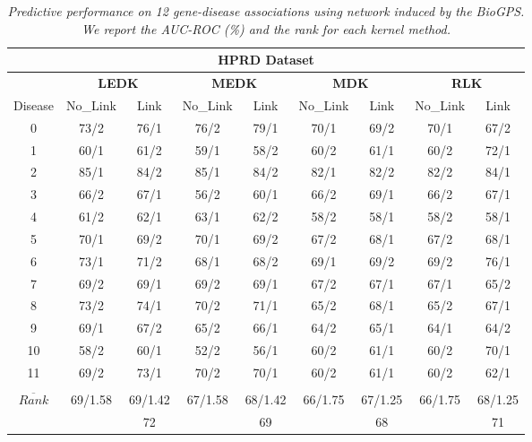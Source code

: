 \documentclass[runningheads,a4paper]{llncs}
\begin{document}
\begin{table*}[!htb]
\centering
\begin{tabular}{|c|c|c|c|c|c|c|c|c|}
\hline
         \multicolumn{9}{|c|}{\textbf{HPRD Dataset}}\\
 \hline
 & \multicolumn{2}{c|}{\textbf{LEDK}} & \multicolumn{2}{c|}{\textbf{MEDK}} & \multicolumn{2}{c|}{\textbf{MDK}} & \multicolumn{2}{c|}{\textbf{RLK}} \\
 \hline
  Disease & No\_Link & Link & No\_Link & Link & No\_Link & Link & No\_Link & Link \\
 \hline
	0 & 73/2 & 76/1 & 76/2 & 79/1 & 70/1 & 69/2 & 70/1 & 67/2 \\

	1 & 60/1 & 61/2 & 59/1 & 58/2 & 60/2 & 61/1 & 60/2 & 72/1 \\

	2 & 85/1 & 84/2 & 85/1 & 84/2 & 82/1 & 82/2 & 82/2 & 84/1 \\

	3 & 66/2 & 67/1 & 56/2 & 60/1 & 66/2 & 69/1 & 66/2 & 67/1 \\

	4 & 61/2 & 62/1 & 63/1 & 62/2 & 58/2 & 58/1 & 58/2 & 58/1 \\

	5 & 70/1 & 69/2 & 70/1 & 69/2 & 67/2 & 68/1 & 67/2 & 68/1 \\

	6 & 73/1 & 71/2 & 68/1 & 68/2 & 69/1 & 69/2 & 69/2 & 76/1 \\

	7 & 69/2 & 69/1 & 69/2 & 69/1 & 67/2 & 67/1 & 67/1 & 65/2 \\

	8 & 73/2 & 74/1 & 70/2 & 71/1 & 65/2 & 68/1 & 65/2 & 67/1 \\

	9 & 69/1 & 67/2 & 65/2 & 66/1 & 64/2 & 65/1 & 64/1 & 64/2 \\

	10 & 58/2 & 60/1 & 52/2 & 56/1 & 60/2 & 61/1 & 60/2 & 70/1 \\

	11 & 69/2 & 73/1 & 70/2 & 70/1 & 60/2 & 61/1 & 60/2 & 62/1 \\
	
	\hline
	\shortstack{$\overline{AUC}$ \\$\overline{Rank}$} & 69/1.58 & 69/1.42 & 67/1.58 & 68/1.42 & 66/1.75 & 67/1.25 & 66/1.75 & 68/1.25 \\
\hline
    & & 72 & & 69 & & 68 & & 71 \\      						
\hline
\end{tabular}
\caption{\textit {Predictive performance on 12 gene-disease associations using network induced by the BioGPS. We report the AUC-ROC (\%) and the rank for each kernel method.}}
\label{table:results}
\end{table*}
\end{document}
